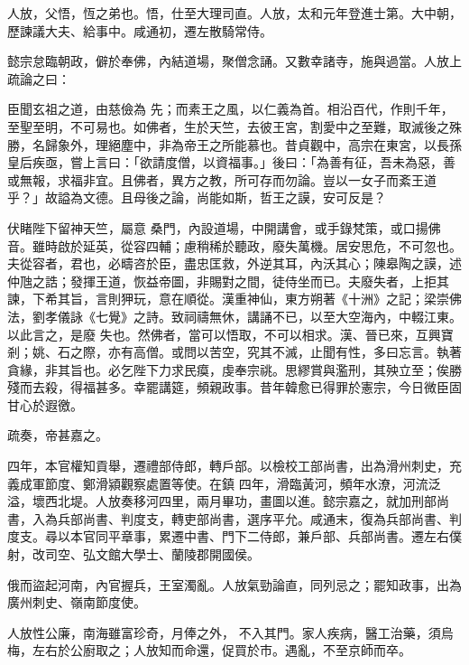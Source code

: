 \begin{pinyinscope}
 人放，父悟，恆之弟也。悟，仕至大理司直。人放，太和元年登進士第。大中朝，歷諫議大夫、給事中。咸通初，遷左散騎常侍。



 懿宗怠臨朝政，僻於奉佛，內結道場，聚僧念誦。又數幸諸寺，施與過當。人放上疏論之曰：



 臣聞玄祖之道，由慈儉為
 先；而素王之風，以仁義為首。相沿百代，作則千年，至聖至明，不可易也。如佛者，生於天竺，去彼王宮，割愛中之至難，取滅後之殊勝，名歸象外，理絕塵中，非為帝王之所能慕也。昔貞觀中，高宗在東宮，以長孫皇后疾亟，嘗上言曰：「欲請度僧，以資福事。」後曰：「為善有征，吾未為惡，善或無報，求福非宜。且佛者，異方之教，所可存而勿論。豈以一女子而紊王道乎？」故謚為文德。且母後之論，尚能如斯，哲王之謨，安可反是？



 伏睹陛下留神天竺，屬意
 桑門，內設道場，中開講會，或手錄梵策，或口揚佛音。雖時啟於延英，從容四輔；慮稍稀於聽政，廢失萬機。居安思危，不可忽也。夫從容者，君也，必疇咨於臣，盡忠匡救，外逆其耳，內沃其心；陳皋陶之謨，述仲虺之誥；發揮王道，恢益帝圖，非賜對之間，徒侍坐而已。夫廢失者，上拒其諫，下希其旨，言則狎玩，意在順從。漢重神仙，東方朔著《十洲》之記；梁崇佛法，劉孝儀詠《七覺》之詩。致祠禱無休，講誦不已，以至大空海內，中輟江東。以此言之，是廢
 失也。然佛者，當可以悟取，不可以相求。漢、晉已來，互興寶剎；姚、石之際，亦有高僧。或問以苦空，究其不滅，止聞有性，多曰忘言。執著貪緣，非其旨也。必乞陛下力求民瘼，虔奉宗祧。思繆賞與濫刑，其殃立至；俟勝殘而去殺，得福甚多。幸罷講筵，頻親政事。昔年韓愈已得罪於憲宗，今日微臣固甘心於遐徼。



 疏奏，帝甚嘉之。



 四年，本官權知貢舉，遷禮部侍郎，轉戶部。以檢校工部尚書，出為滑州刺史，充義成軍節度、鄭滑潁觀察處置等使。在鎮
 四年，滑臨黃河，頻年水潦，河流泛溢，壞西北堤。人放奏移河四里，兩月畢功，畫圖以進。懿宗嘉之，就加刑部尚書，入為兵部尚書、判度支，轉吏部尚書，選序平允。咸通末，復為兵部尚書、判度支。尋以本官同平章事，累遷中書、門下二侍郎，兼戶部、兵部尚書。遷左右僕射，改司空、弘文館大學士、蘭陵郡開國侯。



 俄而盜起河南，內官握兵，王室濁亂。人放氣勁論直，同列忌之；罷知政事，出為廣州刺史、嶺南節度使。



 人放性公廉，南海雖富珍奇，月俸之外，
 不入其門。家人疾病，醫工治藥，須烏梅，左右於公廚取之；人放知而命還，促買於市。遇亂，不至京師而卒。




\end{pinyinscope}
